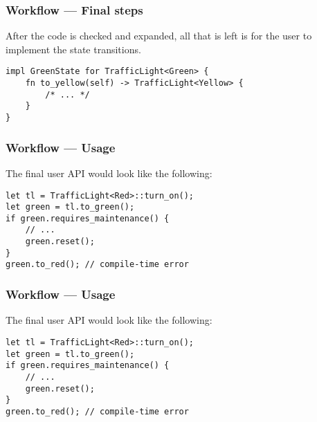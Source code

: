 \documentclass[bigger,notes,aspectratio=169]{beamer}
\begin{document}
\begin{frame}[fragile]
    \frametitle{Workflow --- Final steps}
    After the code is checked and expanded, all that is left is for the user to implement the state transitions.
    \begin{listing}
        \centering
        \begin{verbatim}
impl GreenState for TrafficLight<Green> {
    fn to_yellow(self) -> TrafficLight<Yellow> {
        /* ... */
    }
}
        \end{verbatim}
    \end{listing}

\end{frame}

\begin{frame}[fragile]
    \frametitle{Workflow --- Usage}
    The final user API would look like the following:
    \begin{listing}
        \centering
        \begin{verbatim}
let tl = TrafficLight<Red>::turn_on();
let green = tl.to_green();
if green.requires_maintenance() {
    // ...
    green.reset();
}
green.to_red(); // compile-time error
        \end{verbatim}
    \end{listing}

\end{frame}

\begin{frame}[fragile]
    \frametitle{Workflow --- Usage}
    The final user API would look like the following:
    \begin{listing}
        \centering
        \begin{verbatim}
let tl = TrafficLight<Red>::turn_on();
let green = tl.to_green();
if green.requires_maintenance() {
    // ...
    green.reset();
}
green.to_red(); // compile-time error
        \end{verbatim}
    \end{listing}

\end{frame}
\end{document}
